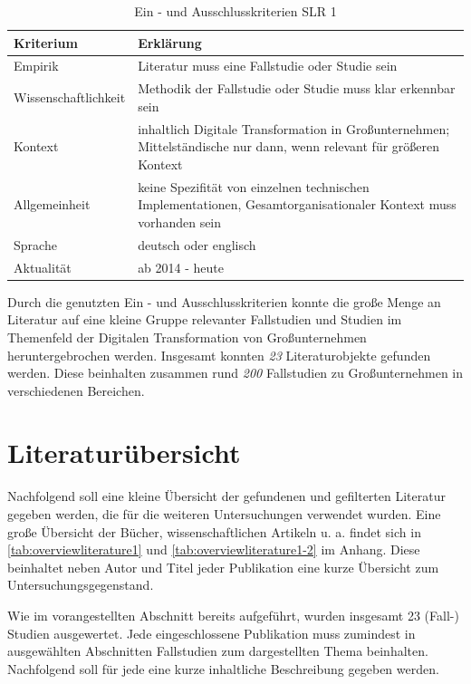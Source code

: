 \begin{table}[ht]
	\centering
	\caption{Ein - und Ausschlusskriterien SLR 1}
	\begin{tabular}{|p{4cm}|p{8cm}|}
		\hline
		\textbf{Kriterium}& \textbf{Erklärung}  \\
		\hline
		Empirik & Literatur muss eine Fallstudie oder Studie sein \\
		Wissenschaftlichkeit & Methodik der  Fallstudie oder Studie muss klar erkennbar sein \\
		Kontext & inhaltlich Digitale Transformation in Großunternehmen; Mittelständische nur dann, wenn relevant für größeren Kontext \\
		Allgemeinheit & keine Spezifität von einzelnen technischen Implementationen, Gesamtorganisationaler Kontext muss vorhanden sein \\
		Sprache & deutsch oder englisch \\
		Aktualität & ab 2014 - heute  \\
		\hline
	\end{tabular}
	\label{tab:criteriaslr1}
\end{table}

Durch die genutzten Ein - und Ausschlusskriterien konnte die große Menge an Literatur auf eine kleine Gruppe relevanter Fallstudien und Studien im Themenfeld der Digitalen Transformation von Großunternehmen heruntergebrochen werden. Insgesamt konnten \textit{23} Literaturobjekte gefunden werden. Diese beinhalten zusammen rund \textit{200} Fallstudien zu Großunternehmen in verschiedenen Bereichen.

\section{Literaturübersicht}


Nachfolgend soll eine kleine Übersicht der gefundenen und gefilterten Literatur gegeben werden, die für die weiteren Untersuchungen verwendet wurden. Eine große Übersicht der  Bücher, wissenschaftlichen Artikeln u. a. findet sich in \ref{tab:overviewliterature1} und \ref{tab:overviewliterature1-2} im Anhang. Diese beinhaltet neben Autor und Titel jeder Publikation eine kurze Übersicht zum Untersuchungsgegenstand.

Wie im vorangestellten Abschnitt bereits aufgeführt, wurden insgesamt 23 (Fall-) Studien ausgewertet. Jede eingeschlossene Publikation muss zumindest in ausgewählten Abschnitten Fallstudien zum dargestellten Thema beinhalten. Nachfolgend soll für jede eine kurze inhaltliche Beschreibung gegeben werden.


